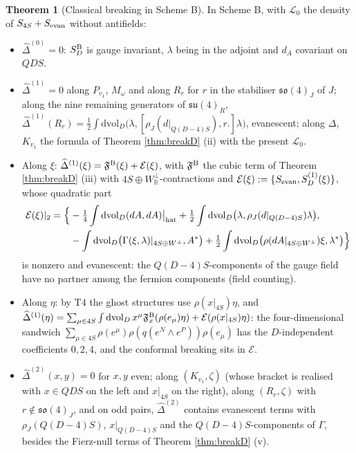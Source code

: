 \documentclass[11pt]{article}
\theoremstyle{definition}
\newtheorem{theorem}[definition]{Theorem}
\numberwithin{equation}{section}
\begin{document}
\begin{theorem}[Classical breaking in Scheme B]
\label{thm:breakB}
In Scheme B, with $\mathscr L_0$ the density of $S_{4S}+S_{\rm evan}$ without antifields:
\begin{itemize}
\item[(i)] $\widehat\Delta^{(0)}=0$: $S^{\rm B}_D$ is gauge invariant, $\lambda$ being in the adjoint and $d_A$ covariant on $QDS$.
\item[(ii)] $\widehat\Delta^{(1)}=0$ along $P_{v_1}$, $M_\omega$ and along $R_r$ for $r$ in the stabiliser $\mathfrak{so}(4)_J$ of $J$; along the nine remaining generators of $\mathfrak{su}(4)_R$, $\widehat\Delta^{(1)}(R_r)=\frac12\int\mathrm{dvol}_D\big(\lambda,[\rho_J(d|_{Q(D-4)S}),r.]\lambda\big)$, evanescent; along $\Delta$, $K_{v_1}$ the formula of Theorem \ref{thm:breakD} (ii) with the present $\mathscr L_0$.
\item[(iii)] Along $\xi$: $\widehat\Delta^{(1)}(\xi)=\mathfrak F^{\rm B}(\xi)+\mathcal E(\xi)$, with $\mathfrak F^{\rm B}$ the cubic term of Theorem \ref{thm:breakD} (iii) with $4S\oplus W^\perp_{\mathbb R}$-contractions and $\mathcal E(\xi):=\{S_{\rm evan},S^{(1)}_D(\xi)\}$, whose quadratic part
\[
\begin{aligned}
\mathcal E(\xi)|_2=\Big\{&-\tfrac14\int\mathrm{dvol}_D(dA,dA)\big|_{\rm hat}+\tfrac12\int\mathrm{dvol}_D\big(\lambda,\rho_J(d|_{Q(D-4)S})\lambda\big),\\
&-\int\mathrm{dvol}_D\big(\Gamma(\xi,\lambda)|_{4S\oplus W^\perp},A^*\big)+\tfrac12\int\mathrm{dvol}_D\big(\rho(dA|_{4S\oplus W^\perp})\xi,\lambda^*\big)\Big\}
\end{aligned}
\]
is nonzero and evanescent: the $Q(D{-}4)S$-components of the gauge field have no partner among the fermion components (field counting).
\item[(iv)] Along $\eta$: by T4 the ghost structures use $\rho(x|_{4S})\eta$, and $\widehat\Delta^{(1)}(\eta)=\sum_{\mu\in4S}\int\mathrm{dvol}_D\,x^\mu\mathfrak F^{\rm B}_x(\rho(e_\mu)\eta)+\mathcal E(\rho(x|_{4S})\eta)$: the four-dimensional sandwich $\sum_{\mu\in4S}\rho(e^\mu)\rho(q(e^N\wedge e^P))\rho(e_\mu)$ has the $D$-independent coefficients $0,2,4$, and the conformal breaking sits in $\mathcal E$.
\item[(v)] $\widehat\Delta^{(2)}(x,y)=0$ for $x,y$ even; along $(K_{v_1},\zeta)$ (whose bracket is realised with $x\in QDS$ on the left and $x|_{4S}$ on the right), along $(R_r,\zeta)$ with $r\notin\mathfrak{so}(4)_J$, and on odd pairs, $\widehat\Delta^{(2)}$ contains evanescent terms with $\rho_J(Q(D{-}4)S)$, $x|_{Q(D-4)S}$ and the $Q(D{-}4)S$-components of $\Gamma$, besides the Fierz-null terms of Theorem \ref{thm:breakD} (v).
\end{itemize}
\end{theorem}
\end{document}
